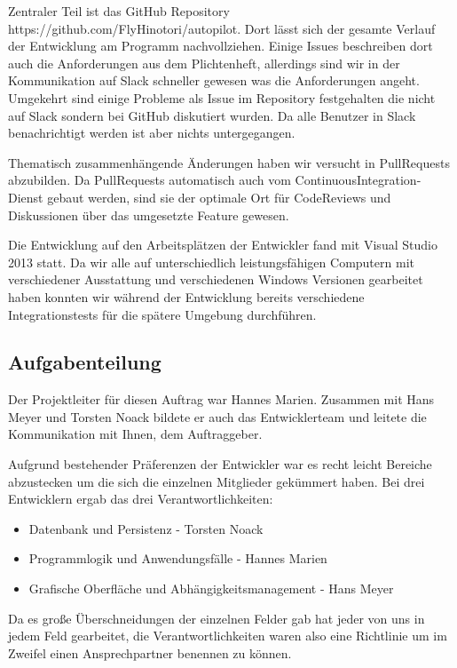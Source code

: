 \documentclass[12pt]{article}
\begin{document}
Zentraler Teil ist das GitHub Repository https://github.com/FlyHinotori/autopilot. Dort lässt sich der gesamte Verlauf der Entwicklung am Programm nachvollziehen. Einige Issues beschreiben dort auch die Anforderungen aus dem Plichtenheft, allerdings sind wir in der Kommunikation auf Slack schneller gewesen was die Anforderungen angeht. Umgekehrt sind einige Probleme als Issue im Repository festgehalten die nicht auf Slack sondern bei GitHub diskutiert wurden. Da alle Benutzer in Slack benachrichtigt werden ist aber nichts untergegangen.
\newline

Thematisch zusammenhängende Änderungen haben wir versucht in PullRequests abzubilden. Da PullRequests automatisch auch vom ContinuousIntegration-Dienst gebaut werden, sind sie der optimale Ort für CodeReviews und Diskussionen über das umgesetzte Feature gewesen.
\newline

Die Entwicklung auf den Arbeitsplätzen der Entwickler fand mit Visual Studio 2013 statt. Da wir alle auf unterschiedlich leistungsfähigen Computern mit verschiedener Ausstattung und verschiedenen Windows Versionen gearbeitet haben konnten wir während der Entwicklung bereits verschiedene Integrationstests für die spätere Umgebung durchführen.

\subsection{Aufgabenteilung}

Der Projektleiter für diesen Auftrag war Hannes Marien. Zusammen mit Hans Meyer und Torsten Noack bildete er auch das Entwicklerteam und leitete die Kommunikation mit Ihnen, dem Auftraggeber.
\newline

Aufgrund bestehender Präferenzen der Entwickler war es recht leicht Bereiche abzustecken um die sich die einzelnen Mitglieder gekümmert haben. Bei drei Entwicklern ergab das drei Verantwortlichkeiten: 

\begin{itemize}
  \item Datenbank und Persistenz - Torsten Noack
  \item Programmlogik und Anwendungsfälle - Hannes Marien
  \item Grafische Oberfläche und Abhängigkeitsmanagement - Hans Meyer
\end{itemize}

Da es große Überschneidungen der einzelnen Felder gab hat jeder von uns in jedem Feld gearbeitet, die Verantwortlichkeiten waren also eine Richtlinie um im Zweifel einen Ansprechpartner benennen zu können.
\newline
\end{document}
